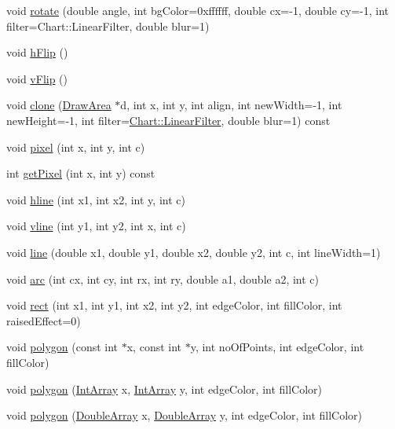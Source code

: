 \begin{DoxyCompactItemize}
void \hyperlink{class_draw_area_a3acdbb124af9bc6a8adab97118b2081a}{rotate} (double angle, int bg\+Color=0xffffff, double cx=-\/1, double cy=-\/1, int filter=\+Chart\+::\+Linear\+Filter, double blur=1)
\item 
void \hyperlink{class_draw_area_a8f6bc42ffcdc59c4b5ab81ff8a466763}{h\+Flip} ()
\item 
void \hyperlink{class_draw_area_a82add495d3776857c69b264055c00362}{v\+Flip} ()
\item 
void \hyperlink{class_draw_area_af2045d87f9eecf5b6649361cf1598ae3}{clone} (\hyperlink{class_draw_area}{Draw\+Area} $\ast$d, int x, int y, int align, int new\+Width=-\/1, int new\+Height=-\/1, int filter=\hyperlink{namespace_chart_ab75b9aa1781d0e0159ef1d441b577764a8cd729b7a982bac2dce8b021511e3ac6}{Chart\+::\+Linear\+Filter}, double blur=1) const
\item 
void \hyperlink{class_draw_area_ab7428780baec8017a20683a1be03650c}{pixel} (int x, int y, int c)
\item 
int \hyperlink{class_draw_area_af2420b0129e8e79b455c507f017c8c7d}{get\+Pixel} (int x, int y) const
\item 
void \hyperlink{class_draw_area_a77f8b8d3591e48dabfa4adca9e534d57}{hline} (int x1, int x2, int y, int c)
\item 
void \hyperlink{class_draw_area_ac679f2b836e67e68994b7977d4881383}{vline} (int y1, int y2, int x, int c)
\item 
void \hyperlink{class_draw_area_a92722dabd76ce0427c9f5033f0b5754e}{line} (double x1, double y1, double x2, double y2, int c, int line\+Width=1)
\item 
void \hyperlink{class_draw_area_ab04d989712f8d711d0b0870d5ea82181}{arc} (int cx, int cy, int rx, int ry, double a1, double a2, int c)
\item 
void \hyperlink{class_draw_area_ac2ec55572e83f653e1e62a90b222913d}{rect} (int x1, int y1, int x2, int y2, int edge\+Color, int fill\+Color, int raised\+Effect=0)
\item 
void \hyperlink{class_draw_area_a009ef7a0fe6005a3f786b842cc563ef8}{polygon} (const int $\ast$x, const int $\ast$y, int no\+Of\+Points, int edge\+Color, int fill\+Color)
\item 
void \hyperlink{class_draw_area_a2350520369e54d4dfe141d1f3eba099b}{polygon} (\hyperlink{class_int_array}{Int\+Array} x, \hyperlink{class_int_array}{Int\+Array} y, int edge\+Color, int fill\+Color)
\item 
void \hyperlink{class_draw_area_ac562a79e307037789a5cabaebde77256}{polygon} (\hyperlink{class_double_array}{Double\+Array} x, \hyperlink{class_double_array}{Double\+Array} y, int edge\+Color, int fill\+Color)

\end{DoxyCompactItemize}
